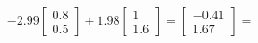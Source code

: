\documentclass[preview]{standalone}
\begin{document}
\begin{align*}
-2.99 \begin{bmatrix} 0.8 \\ 0.5 \end{bmatrix} + 1.98 \begin{bmatrix} 1 \\ 1.6 \end{bmatrix} = \begin{bmatrix} -0.41 \\ 1.67 \end{bmatrix} =
\end{align*}
\end{document}
